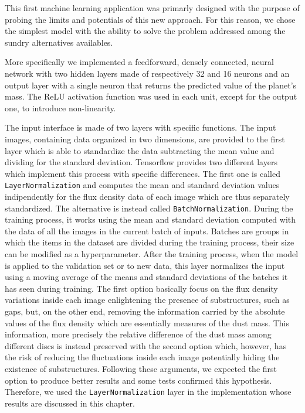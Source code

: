 \documentclass[a4paper,10pt]{report}
\begin{document}
This first machine learning application was primarly designed with the purpose of probing the limits and potentials
of this new approach. For this reason, we chose the simplest model with the ability to solve the problem addressed among the
sundry alternatives availables.

More specifically we implemented a feedforward, densely connected, neural network with two hidden layers
made of respectively 32 and 16 neurons and an output layer with a single neuron that returns the predicted value of the planet's mass.
The ReLU activation function was used in each unit, except for the output one, to introduce non-linearity.

The input interface is made of two layers with specific functions.
The input images, containing data organized in two dimensions, are provided to the first layer which is able to standardize the data 
subtracting the mean value and dividing for the standard deviation.
Tensorflow provides two different layers which implement this process with specific differences.
The first one is called \lstinline{LayerNormalization} and computes the mean and standard deviation
values indipendently for the flux density data of each image which are thus separately
standardized.
The alternative is instead called \lstinline{BatchNormalization}. During the training process, it works
using the mean and standard deviation computed with the data of all the images in the current batch of inputs. 
Batches are groups in which the items in the dataset are divided during 
the training process, their size can be modified as a hyperparameter.
After the training process, when the model is applied to the validation set or to new data, 
this layer normalizes the input using a moving average of the means and standard deviations of the batches it has seen during training.
The first option basically focus on the flux density variations inside each image enlightening the presence of substructures, such as gaps, 
but, on the other end, removing the information carried by the absolute values of the flux density which are essentially measures
of the dust mass. This information, more precisely the relative difference of the dust mass among different discs is instead preserved 
with the second option which, however, has the risk of reducing the fluctuations inside each image potentially hiding the existence
of substructures.
Following these arguments, we expected the first option to produce better results and some tests confirmed this hypothesis.
Therefore, we used the \lstinline{LayerNormalization} layer in the implementation whose results are discussed in this chapter.
\end{document}
